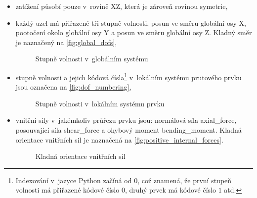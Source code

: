 \begin{itemize}
    \item zatížení působí pouze v~rovině \gls{X}\gls{Z}, která je zároveň rovinou symetrie,
    \item každý uzel má přiřazené tři stupně volnosti, posun ve směru globální osy \gls{X}, pootočení okolo globální osy \gls{Y} a posun ve směru globální osy \gls{Z}. Kladný směr je naznačený na \autoref{fig:global_dofs},    
    \begin{figure}[H]
        
        \caption{Stupně volnosti v~globálním systému}
        \label{fig:global_dofs}
    \end{figure}

    \item stupně volnosti a jejich kódová čísla\footnote{Indexování v~jazyce Python začíná od $0$, což znamená, že první stupeň volnosti má přiřazené kódové číslo $0$, druhý prvek má kódové číslo $1$ atd.} v~lokálním systému prutového prvku jsou označena na \autoref{fig:dof_numbering},
    
    \begin{figure}[H]
        
        \caption{Stupně volnosti v~lokálním systému prvku}
        \label{fig:dof_numbering}
    \end{figure}

    \item vnitřní síly v~jakémkoliv průřezu prvku jsou: normálová síla \gls{axial_force}, posouvající síla \gls{shear_force} a ohybový moment \gls{bending_moment}. Kladná orientace vnitřních sil je naznačená na \autoref{fig:positive_internal_forces}.
    \begin{figure}[H]
        
        \caption{Kladná orientace vnitřních sil}
        \label{fig:positive_internal_forces}
    \end{figure}
\end{itemize}

